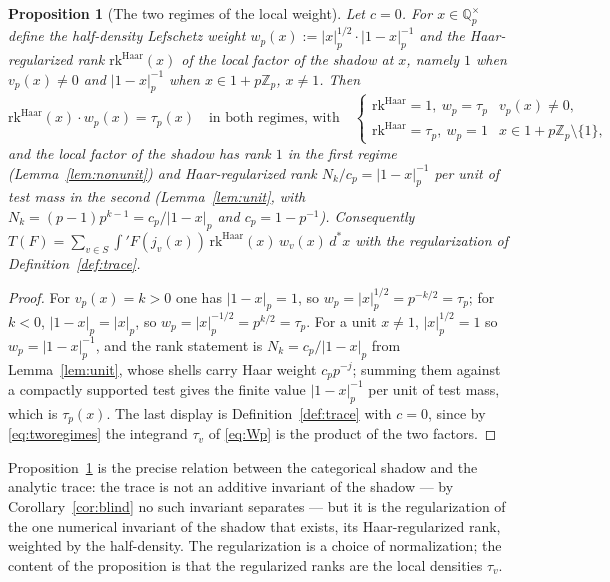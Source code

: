 \documentclass[11pt]{amsart}
\newtheorem{proposition}[theorem]{Proposition}
\theoremstyle{definition}
\theoremstyle{remark}
\newcommand{\Z}{\mathbb Z}
\newcommand{\Q}{\mathbb Q}
\newcommand{\dstar}{\,d^{*}}
\begin{document}
\begin{proposition}[The two regimes of the local weight]\label{prop:haarrank}
Let $c=0$.  For $x\in\Q_p^{\times}$ define the \emph{half-density Lefschetz
weight} $w_p(x):=|x|_p^{1/2}\cdot|1-x|_p^{-1}$ and the \emph{Haar-regularized
rank} $\mathrm{rk}^{\mathrm{Haar}}(x)$ of the local factor of the shadow at
$x$, namely $1$ when $v_p(x)\ne0$ and $|1-x|_p^{-1}$ when $x\in1+p\Z_p$,
$x\ne1$.  Then
\begin{equation}\label{eq:tworegimes}
\mathrm{rk}^{\mathrm{Haar}}(x)\cdot w_p(x)=\tau_p(x)\quad\text{in both
regimes, with}\quad
\begin{cases}
\mathrm{rk}^{\mathrm{Haar}}=1,\ w_p=\tau_p & v_p(x)\ne0,\\
\mathrm{rk}^{\mathrm{Haar}}=\tau_p,\ w_p=1 & x\in 1+p\Z_p\setminus\{1\},
\end{cases}
\end{equation}
and the local factor of the shadow has rank $1$ in the first regime
(Lemma~\ref{lem:nonunit}) and Haar-regularized rank
$N_k/c_p=|1-x|_p^{-1}$ per unit of test mass in the second
(Lemma~\ref{lem:unit}, with $N_k=(p-1)p^{k-1}=c_p/|1-x|_p$ and
$c_p=1-p^{-1}$).  Consequently $T(F)=\sum_{v\in
S}\int'F(j_v(x))\,\mathrm{rk}^{\mathrm{Haar}}(x)\,w_v(x)\dstar x$ with the
regularization of Definition~\ref{def:trace}.
\end{proposition}

\begin{proof}
For $v_p(x)=k>0$ one has $|1-x|_p=1$, so $w_p=|x|_p^{1/2}=p^{-k/2}=\tau_p$; for
$k<0$, $|1-x|_p=|x|_p$, so $w_p=|x|_p^{-1/2}=p^{k/2}=\tau_p$.  For a unit
$x\ne1$, $|x|_p^{1/2}=1$ so $w_p=|1-x|_p^{-1}$, and the rank statement is
$N_k=c_p/|1-x|_p$ from Lemma~\ref{lem:unit}, whose shells carry Haar weight
$c_pp^{-j}$; summing them against a compactly supported test gives the finite
value $|1-x|_p^{-1}$ per unit of test mass, which is $\tau_p(x)$.  The last
display is Definition~\ref{def:trace} with $c=0$, since by \eqref{eq:tworegimes}
the integrand $\tau_v$ of \eqref{eq:Wp} is the product of the two factors.
\end{proof}

Proposition~\ref{prop:haarrank} is the precise relation between the categorical
shadow and the analytic trace: the trace is not an additive invariant of the
shadow --- by Corollary~\ref{cor:blind} no such invariant separates ---
but it is the regularization of the one numerical invariant of the shadow that
exists, its Haar-regularized rank, weighted by the half-density.  The
regularization is a choice of normalization; the content of the proposition is
that the regularized ranks are the local densities $\tau_v$.
\end{document}
